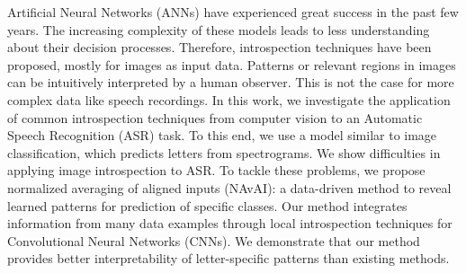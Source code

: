Artificial Neural Networks (ANNs) have experienced great success in the past few years. The increasing complexity of these models leads to less understanding about their decision processes. Therefore, introspection techniques have been proposed, mostly for images as input data. Patterns or relevant regions in images can be intuitively interpreted by a human observer. This is not the case for more complex data like speech recordings. In this work, we investigate the application of common introspection techniques from computer vision to an Automatic Speech Recognition (ASR) task. To this end, we use a model similar to image classification, which predicts letters from spectrograms. We show difficulties in applying image introspection to ASR. To tackle these problems, we propose normalized averaging of aligned inputs (NAvAI): a data-driven method to reveal learned patterns for prediction of specific classes. Our method integrates information from many data examples through local introspection techniques for Convolutional Neural Networks (CNNs). We demonstrate that our method provides better interpretability of letter-specific patterns than existing methods.
